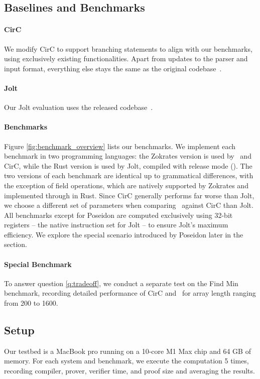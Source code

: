 \subsection{Baselines and Benchmarks}
\paragraph{CirC} We modify CirC to support branching statements to align with our benchmarks, using exclusively existing functionalities. Apart from updates to the parser and input format, everything else stays the same as the original codebase~\cite{circ_codebase}.

\paragraph{Jolt} Our Jolt evaluation uses the released codebase~\cite{jolt_codebase}.

\paragraph{Benchmarks} Figure \ref{fig:benchmark_overview} lists our benchmarks. We implement each benchmark in two programming languages: the Zokrates version is used by \CoBBl~and CirC, while the Rust version is used by Jolt, compiled with release mode (). The two versions of each benchmark are identical up to grammatical differences, with the exception of field operations, which are natively supported by Zokrates and implemented through  in Rust. Since CirC generally performs far worse than Jolt, we choose a different set of parameters when comparing \CoBBl~against CirC than Jolt. All benchmarks except for Poseidon are computed exclusively using 32-bit registers -- the native instruction set for Jolt -- to ensure Jolt's maximum efficiency. We explore the special scenario introduced by Poseidon later in the section.

\paragraph{Special Benchmark} To answer question \ref{q:tradeoff}, we conduct a separate test on the Find Min benchmark, recording detailed performance of CirC and \CoBBl~for array length ranging from 200 to 1600.



\subsection{Setup}
Our testbed is a MacBook pro running on a 10-core M1 Max chip and 64 GB of memory. For each system and benchmark, we execute the computation 5 times, recording compiler, prover, verifier time, and proof size and averaging the results. 

